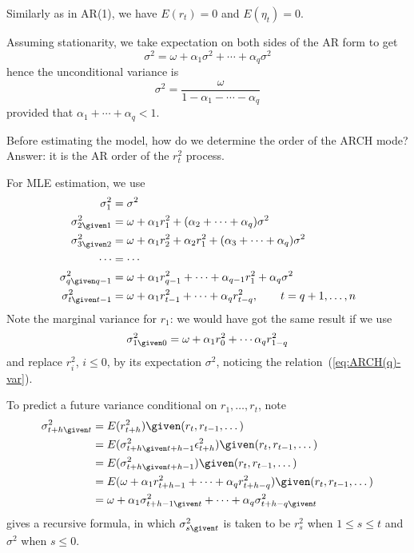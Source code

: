 \documentclass[12pt]{article}
\begin{document}
Similarly as in AR(1), we have
$ E(r_t) = 0 $ and $ E(\eta_t) = 0$.

Assuming stationarity,
we take expectation on both sides of the AR form to get
\[
\sigma^2 = \omega + \alpha_1 \sigma^2 + \dotsb + \alpha_q \sigma^2
\]
hence the unconditional variance is
\begin{equation}\label{eq:ARCH(q)-var}
\sigma^2 = \frac{\omega}{1 - \alpha_1 - \dotsb - \alpha_q}
\end{equation}
provided that
$\alpha_1 + \dotsb + \alpha_q < 1$.


Before estimating the model,
how do we determine the order of the ARCH mode?
Answer: it is the AR order of the $r^2_t$ process.

For MLE estimation, we use
\begin{align*}
\sigma^2_1 &= \sigma^2\\
\sigma^2_{2\given 1} &=
    \omega + \alpha_1 r_1^2 + (\alpha_2 +\dotsb + \alpha_q) \sigma^2\\
\sigma^2_{3\given 2} &=
    \omega + \alpha_1 r_2^2 + \alpha_2 r_1^2 +
        (\alpha_3 +\dotsb + \alpha_q) \sigma^2\\
\dotsb &= \dotsb\\
\sigma^2_{q\given q-1} &=
    \omega + \alpha_1 r_{q-1}^2 + \dotsb +
        \alpha_{q-1} r_1^2
        + \alpha_q \sigma^2\\
\sigma^2_{t\given t-1} &=
    \omega + \alpha_1 r_{t-1}^2 + \dotsb +
        \alpha_q r_{t-q}^2,
        \qquad t=q+1,\dotsc,n
\end{align*}
Note the marginal variance for
$r_1$: we would have got the same result if we use
\[
\sigma^2_{1\given 0}
= \omega + \alpha_1 r_0^2 + \dotsb \alpha_q r_{1-q}^2
\]
and replace $r^2_i$, $i\le 0$, by its expectation $\sigma^2$,
noticing the relation~(\ref{eq:ARCH(q)-var}).

To predict a future variance conditional on
$r_1,\dotsc,r_t$,
note
\[\begin{split}
\sigma^2_{t+h\given t}
&= E(r^2_{t+h}) \given (r_t,r_{t-1},\dotsc)
\\
&= E(\sigma^2_{t+h\given t+h-1} \epsilon^2_{t+h}) \given (r_t,r_{t-1},\dotsc)
\\
&= E(\sigma^2_{t+h\given t+h-1}) \given (r_t,r_{t-1},\dotsc)
\\
&= E(\omega + \alpha_1 r^2_{t+h-1} + \dotsb + \alpha_q r^2_{t+h-q})
    \given (r_t,r_{t-1},\dotsc)
\\
&= \omega + \alpha_1 \sigma^2_{t+h-1\given t} + \dotsb
    + \alpha_q \sigma^2_{t+h-q\given t}
\end{split}
\]
gives a recursive formula,
in which
$\sigma^2_{s\given t}$ is taken to be
$r^2_s$ when $1 \le s \le t$
and
$\sigma^2$ when $s \le 0$.
\end{document}
